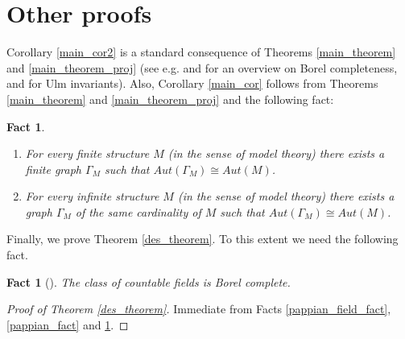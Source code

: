\documentclass{amsart}
\newtheorem{fact}[theorem]{Fact}
\numberwithin{claimcounter}{theorem}
\begin{document}
\section{Other proofs}

Corollary \ref{main_cor2} is a standard consequence of Theorems \ref{main_theorem} and \ref{main_theorem_proj} (see e.g. \cite{friedman} and \cite{gao} for an overview on Borel completeness, and \cite{ulm_inv_paper} for Ulm invariants). Also, Corollary \ref{main_cor} follows from Theorems \ref{main_theorem} and \ref{main_theorem_proj} and the following fact:

	\begin{fact} 
\begin{enumerate}[(1)]
	\item For every finite structure $M$ (in the sense of model theory) there exists a finite graph $\Gamma_M$ such that $Aut(\Gamma_M) \cong Aut(M)$.
	\item For every infinite structure $M$ (in the sense of model theory) there exists a graph $\Gamma_M$ of the same cardinality of $M$ such that $Aut(\Gamma_M) \cong Aut(M)$.
\end{enumerate}
\end{fact}

	Finally, we prove Theorem \ref{des_theorem}. To this extent we need the following fact.

	\begin{fact}[{\cite[3.2]{friedman}}]\label{field_fact} The class of countable fields is Borel complete.
\end{fact}

	\begin{proof}[Proof of Theorem \ref{des_theorem}] Immediate from Facts \ref{pappian_field_fact}, \ref{pappian_fact} and \ref{field_fact}.
\end{proof}
\end{document}
